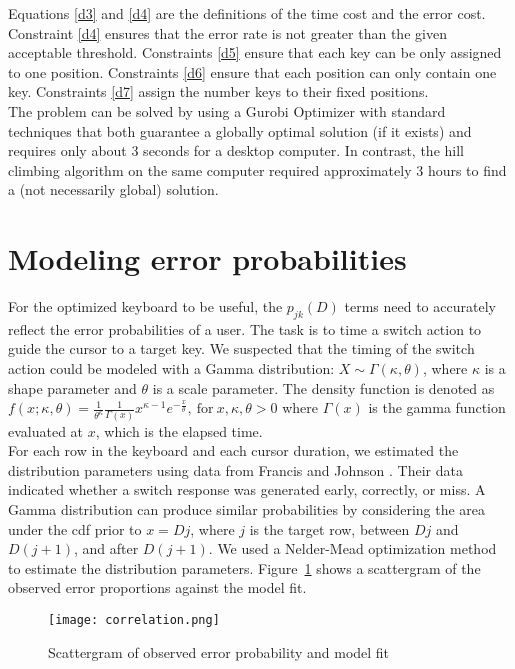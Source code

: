 \documentclass{sig-alternate}
\begin{document}
Equations \eqref{d3} and \eqref{d4} are the definitions of the time cost and the error cost. Constraint \eqref{d4}
ensures that the error rate is not greater than the given acceptable threshold. Constraints
\eqref{d5} ensure that each key can be only assigned to one position. Constraints \eqref{d6} ensure that each position
can only contain one key. Constraints \eqref{d7} assign the number keys to their fixed positions.\\
The problem can be solved by using a Gurobi Optimizer with standard techniques that both guarantee a globally optimal solution (if it exists) and requires only about 3 seconds for a desktop computer. In contrast, the hill climbing algorithm on the same computer required approximately 3 hours to find a (not necessarily global) solution.\\
\section{Modeling error probabilities}
For the optimized keyboard to be useful, the $p_{jk}(D)$ terms need to accurately reflect the error probabilities of a user.  The task is to time a switch action to guide the cursor to a target key. We suspected that the timing of the switch action could be modeled with a Gamma distribution: $X \sim \Gamma(\kappa, \theta)$, where $\kappa$ is a shape parameter and $\theta$ is a scale parameter. The density function is denoted as $f(x; \kappa, \theta)=\frac{1}{\theta^{\kappa}}\frac{1}{\Gamma(x)}x^{\kappa-1}e^{-\frac{x}{\theta}},\ \text{for}\ x,\kappa,\theta>0$ where $\Gamma(x)$ is the gamma function evaluated at $x$, which is the elapsed time.\\
For each row in the keyboard and each cursor duration, we estimated the distribution parameters using data from Francis and Johnson \cite{Francis2011}. Their data indicated whether a switch response was generated early, correctly, or miss. A  Gamma distribution can produce similar probabilities by considering the area under the cdf prior to $x = Dj $, where $ j $ is the target row, between $Dj$ and $D(j+1)$, and after $D(j+1)$. We used a Nelder-Mead optimization method to estimate the distribution parameters. Figure~\ref{cor} shows a scattergram of the observed error proportions against the model fit. 
\begin{figure}[htb!]
		\centering
		\texttt{[image: correlation.png]}\\
		\caption{Scattergram of observed error probability and model fit}
		\label{cor}
\end{figure}
\end{document}
